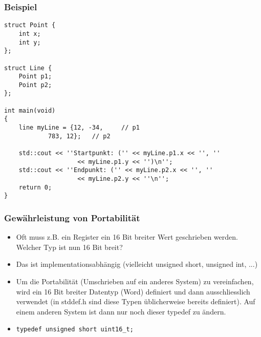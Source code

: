 \subsubsection{Beispiel\hfill}
\label{sec:Beispiel}
\noindent
\begin{minipage}{\linewidth}
\begin{lstlisting}
struct Point {
	int x;
	int y;
};

struct Line {
	Point p1;
	Point p2;
};

int main(void)
{
	line myLine = {12, -34,		// p1
			783, 12};	// p2
		
	std::cout << ''Startpunkt: ('' << myLine.p1.x << '', ''
					<< myLine.p1.y << '')\n'';
	std::cout << ''Endpunkt: ('' << myLine.p2.x << '', ''
					<< myLine.p2.y << ''\n'';
	return 0;
}
\end{lstlisting}
\end{minipage}

\subsubsection{Gewährleistung von Portabilität\hfill}
\label{sec:Gewaehrleistung von Portabilitaet}
\begin{itemize}
	\item Oft muss z.B. ein Register ein 16 Bit breiter Wert geschrieben werden. Welcher Typ ist nun 16 Bit breit?
	\item Das ist implementationsabhängig (vielleicht unsigned short, unsigned int, ...)
	\item Um die Portabilität (Umschrieben auf ein anderes System) zu vereinfachen, wird ein 16 Bit breiter Datentyp (Word) definiert und dann ausschliesslich verwendet (in stddef.h sind diese Typen üblicherweise bereits definiert). Auf einem anderen System ist dann nur noch dieser typedef zu ändern.
	\item[\-] 
\noindent
\begin{minipage}{\linewidth}
\begin{lstlisting}
typedef unsigned short uint16_t;
\end{lstlisting}
\end{minipage}
\end{itemize}

